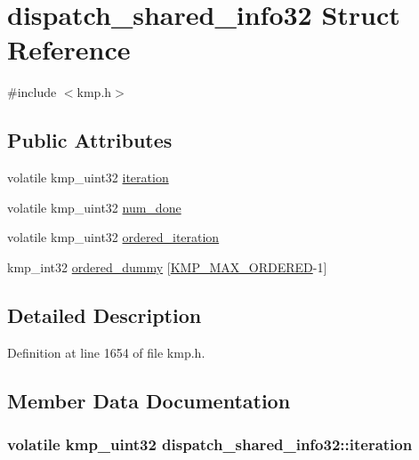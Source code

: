 \hypertarget{structdispatch__shared__info32}{\section{dispatch\-\_\-shared\-\_\-info32 Struct Reference}
\label{structdispatch__shared__info32}
}


{\ttfamily \#include $<$kmp.\-h$>$}

\subsection*{Public Attributes}
\begin{DoxyCompactItemize}
\item 
volatile kmp\-\_\-uint32 \hyperlink{structdispatch__shared__info32_a8bf8bcc89dcfb18d4c95fc04221c0ff0}{iteration}
\item 
volatile kmp\-\_\-uint32 \hyperlink{structdispatch__shared__info32_ab2d5d2c56afd2fae3393d125678b3ca4}{num\-\_\-done}
\item 
volatile kmp\-\_\-uint32 \hyperlink{structdispatch__shared__info32_a7ac74e8bb8348a7516917151ab987332}{ordered\-\_\-iteration}
\item 
kmp\-\_\-int32 \hyperlink{structdispatch__shared__info32_ae4ef1980d5d99374fc19214e3bdbf5b6}{ordered\-\_\-dummy} \mbox{[}\hyperlink{kmp_8h_ab5cc9eb736cfbc3fe74fc2324c0b19be}{K\-M\-P\-\_\-\-M\-A\-X\-\_\-\-O\-R\-D\-E\-R\-E\-D}-\/1\mbox{]}
\end{DoxyCompactItemize}


\subsection{Detailed Description}


Definition at line 1654 of file kmp.\-h.



\subsection{Member Data Documentation}
\hypertarget{structdispatch__shared__info32_a8bf8bcc89dcfb18d4c95fc04221c0ff0}{
\subsubsection[{iteration}]{\setlength{\rightskip}{0pt plus 5cm}volatile kmp\-\_\-uint32 dispatch\-\_\-shared\-\_\-info32\-::iteration}}\label{structdispatch__shared__info32_a8bf8bcc89dcfb18d4c95fc04221c0ff0}


